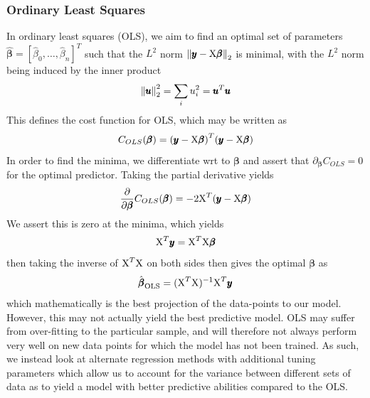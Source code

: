 \documentclass[reprint, english, nofootinbib]{revtex4-2}
\begin{document}
        \subsubsection{Ordinary Least Squares}
            \noindent
            In ordinary least squares (OLS), we aim to find an optimal set of parameters $\pmb{\hat\beta} = [\hat\beta_0, \dots, \hat\beta_n]^T$ such that the $L^2$ norm $\norm{\pmb y - \textup{X}\pmb{\beta}}_2$ is minimal, with the $L^2$ norm being induced by the inner product
            \begin{equation}
                \norm{\pmb u}_2^2 = \sum_i u_i^2 = \pmb u^T \pmb u
            \end{equation}
            This defines the cost function for OLS, which may be written as
            \begin{equation}
                C_{OLS}(\pmb \beta)
                = \qty(\pmb y - \textup{X}\pmb \beta)^T(\pmb y - \textup{X}\pmb \beta)
            \end{equation}
            In order to find the minima, we differentiate wrt to $\pmb\beta$ and assert that $\partial_{\pmb\beta}C_{OLS} = 0$ for the optimal predictor. Taking the partial derivative yields
            \begin{align}
                \begin{split}
                \pdv{\pmb\beta}C_{OLS}(\pmb\beta) = -2\textup{X}^T\qty(\pmb y - \textup X\pmb \beta)
                \end{split}
            \end{align}
            We assert this is zero at the minima, which yields
            \begin{equation}
                \textup{X}^T\pmb y = \textup{X}^T\textup{X}\pmb\beta
            \end{equation}
            then taking the inverse of $\textup{X}^T\textup{X}$ on both sides then gives the optimal $\pmb\beta$ as
            \begin{equation}\label{eqn:OLS optimal beta}
                \hat{\pmb \beta}_{\textup{OLS}} = (\textup{X}^T\textup{X})^{-1}\textup{X}^T\pmb y
            \end{equation}
            which mathematically is the best projection of the data-points to our model. However, this may not actually yield the best predictive model. OLS may suffer from over-fitting to the particular sample, and will therefore not always perform very well on new data points for which the model has not been trained. As such, we instead look at alternate regression methods with additional tuning parameters which allow us to account for the variance between different sets of data as to yield a model with better predictive abilities compared to the OLS.
\end{document}
